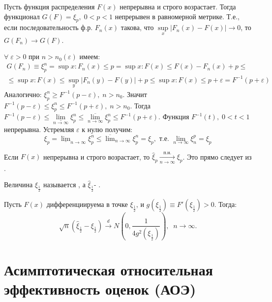 \begin{lemma}
	Пусть функция распределения $F(x)$ непрерывна и строго возрастает. Тогда функционал $G(F) = \xi_p, \; 0<p<1$ непрерывен в равномерной метрике. Т.е., если последовательность ф.р. ${F_n(x)}$ такова, что $\displaystyle \sup\limits_x|F_n(x) - F(x)|\rightarrow0$, то $\displaystyle G(F_n)\rightarrow G(F)$.
\end{lemma}
\begin{Proof}
	$\forall\;\varepsilon>0$ при $n>n_0(\varepsilon)$ имеем:
	$$\begin{gathered}
		G(F_n) \equiv \xi_p^n = \sup{x: F_n(x) \leq p} = \sup{x: F(x) \leq F(x) - F_n(x)+p}\leq \\ 
		\le \sup{x: F(x) \leq \sup\limits_y|F_n(y)-F(y)|+p} \leq \sup{x: F(x)\leq p+\varepsilon} = F^{-1}(p+\varepsilon) 
	\end{gathered}$$
	Аналогично: $\displaystyle \xi_p^n \geq F^{-1}(p-\varepsilon),\;n>n_0$. Значит $\displaystyle F^{-1}(p-\varepsilon)\leq\xi_p^n\leq F^{-1}(p+\varepsilon),\;n>n_0$. Тогда $\displaystyle F^{-1}(p-\varepsilon)\leq \underset{n\to\infty}{\underline{\lim}}\xi_p^n\leq \underset{n\to\infty}{\overline{\lim}}\xi_p^n \leq F^{-1}(p+\varepsilon)$.
	Функция $F^{-1}(t),\;0<t<1$ непрерывна. Устремляя $\varepsilon$ к нулю получим:
	$$\xi_p=\underline{\lim}_{n\rightarrow\infty}\xi_p^n\leq\overline{\lim}_{n\rightarrow\infty}\xi_p^n=\xi_p, \text{ т.е. } \lim\limits_{n\rightarrow\infty}\xi_n^p=\xi_p$$
\end{Proof}

\begin{conseq}
	Если $F(x)$ непрерывна и строго возрастает, то $\displaystyle \hat{\xi}_p \xrightarrow[n\rightarrow\infty]{\text{п.н.}} \xi_p$. Это прямо следует из .
\end{conseq}
\begin{definition}
	Величина $\xi_{\frac{1}{2}}$ называется , а $\hat{\xi}_{\frac{1}{2}}$- .
\end{definition}

\begin{theorem}
	Пусть $F(x)$ дифференциируема в точке $\xi_{\frac{1}{2}}$, и $g(\xi_{\frac{1}{2}})\equiv F'(\xi_{\frac{1}{2}})>0$. Тогда:
	\[\sqrt{n}(\hat{\xi}_{\frac{1}{2}}-\xi_{\frac{1}{2}})\xrightarrow{d}N(0,\frac{1}{4g^2(\xi_{\frac{1}{2}})}),\;\;n\rightarrow\infty. \]
\end{theorem}

\section{Асимптотическая относительная эффективность оценок (АОЭ)}\label{lec:3/sec:3}

